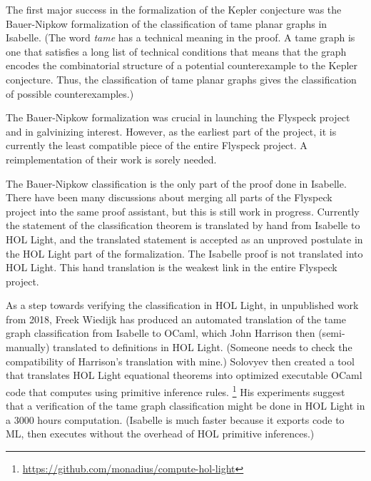 \documentclass{amsart}
\begin{document}
The first major success in the formalization of the Kepler conjecture
was the Bauer-Nipkow formalization of the classification of tame
planar graphs in Isabelle.  (The word \emph{tame} has a technical
meaning in the proof.  A tame graph is one that satisfies a long list
of technical conditions that means that the graph encodes the
combinatorial structure of a potential counterexample to the Kepler
conjecture. Thus, the classification of tame planar graphs gives the
classification of possible counterexamples.)

The Bauer-Nipkow formalization was crucial in launching the Flyspeck
project and in galvinizing interest.  However, as the earliest part of
the project, it is currently the least compatible piece of the entire
Flyspeck project.  A reimplementation of their work is sorely needed.

The Bauer-Nipkow classification is the only part of the proof done in
Isabelle.  There have been many discussions about merging all parts of
the Flyspeck project into the same proof assistant, but this is still
work in progress.  Currently the statement of the classification
theorem is translated by hand from Isabelle to HOL Light, and the
translated statement is accepted as an unproved postulate in the HOL
Light part of the formalization.  The Isabelle proof is not translated
into HOL Light.  This hand translation is the weakest link in the
entire Flyspeck project.

As a step towards verifying the classification in HOL Light, in
unpublished work from 2018, Freek Wiedijk has produced an automated
translation of the tame graph classification from Isabelle to OCaml,
which John Harrison then (semi-manually) translated to definitions in HOL Light.
(Someone needs to check the compatibility of Harrison's translation with mine.)
Solovyev then created a tool that translates HOL Light equational theorems
into optimized executable OCaml code that computes using primitive inference rules.%
\footnote{\url{https://github.com/monadius/compute-hol-light}} His
experiments suggest that a verification of the tame graph
classification might be done in HOL Light in a 3000 hours computation.
(Isabelle is much faster because it exports code to ML, then executes
without the overhead of HOL primitive inferences.)
\end{document}
